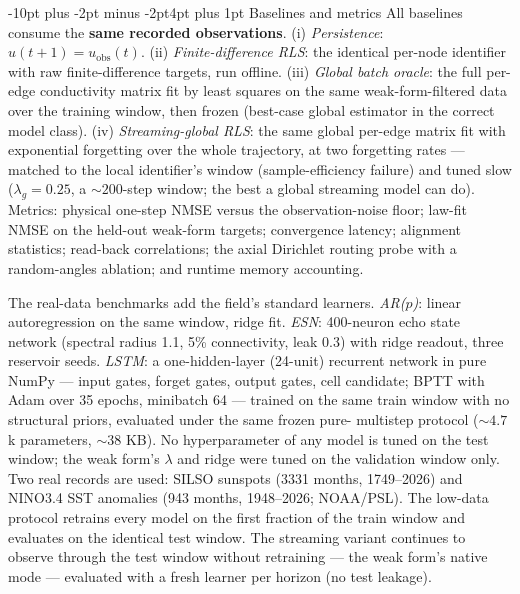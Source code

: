 \documentclass[10pt]{article}
\makeatletter
\renewcommand\subsection{\@startsection{subsection}{2}{\z@}%
  {-10pt plus -2pt minus -2pt}{4pt plus 1pt}%
  {\normalfont\bfseries\normalsize}}
\makeatother
\begin{document}
\subsection{Baselines and metrics}
All baselines consume the \textbf{same recorded observations}. (i) \emph{Persistence}:
$\hat u(t+1) = u_{\mathrm{obs}}(t)$. (ii) \emph{Finite-difference RLS}: the identical
per-node identifier with raw finite-difference targets, run offline. (iii) \emph{Global
batch oracle}: the full per-edge conductivity matrix fit by least squares on the same
weak-form-filtered data over the training window, then frozen (best-case global
estimator in the correct model class). (iv) \emph{Streaming-global RLS}: the same
global per-edge matrix fit with exponential forgetting over the whole trajectory, at
two forgetting rates --- matched to the local identifier's window (sample-efficiency
failure) and tuned slow ($\lambda_g = 0.25$, a ${\sim}200$-step window; the best a
global streaming model can do). Metrics: physical one-step NMSE versus the
observation-noise floor; law-fit NMSE on the held-out weak-form targets; convergence
latency; alignment statistics; read-back correlations; the axial Dirichlet routing
probe with a random-angles ablation; and runtime memory accounting.

The real-data benchmarks add the field's standard learners. \emph{AR($p$)}:
linear autoregression on the same window, ridge fit. \emph{ESN}: 400-neuron echo
state network (spectral radius 1.1, 5\% connectivity, leak 0.3) with ridge
readout, three reservoir seeds. \emph{LSTM}: a one-hidden-layer (24-unit)
recurrent network in pure NumPy --- input gates, forget gates, output gates, cell
candidate; BPTT with Adam over 35 epochs, minibatch 64 --- trained on the same
train window with no structural priors, evaluated under the same frozen pure-
multistep protocol (${\sim}4.7$k parameters, ${\sim}38$ KB). No hyperparameter of
any model is tuned on the test window; the weak form's $\lambda$ and ridge were
tuned on the validation window only. Two real records are used: SILSO sunspots
(3331 months, 1749--2026) and NINO3.4 SST anomalies (943 months, 1948--2026;
NOAA/PSL). The low-data protocol retrains every model on the first fraction of the
train window and evaluates on the identical test window. The streaming variant
continues to observe through the test window without retraining --- the weak form's
native mode --- evaluated with a fresh learner per horizon (no test leakage).
\end{document}
